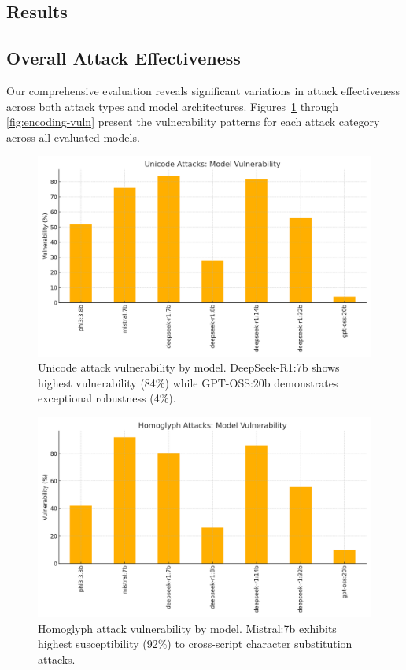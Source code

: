 \documentclass[11pt]{article}
\begin{document}
\begin{multicols}{2}
\section{Results}

\subsection{Overall Attack Effectiveness}

Our comprehensive evaluation reveals significant variations in attack effectiveness across both attack types and model architectures. Figures~\ref{fig:unicode-vuln} through \ref{fig:encoding-vuln} present the vulnerability patterns for each attack category across all evaluated models.

\begin{figure}[H]
\centering
\includegraphics[width=\columnwidth]{unicode_vulnerability_by_model.png}
\caption{Unicode attack vulnerability by model. DeepSeek-R1:7b shows highest vulnerability (84\%) while GPT-OSS:20b demonstrates exceptional robustness (4\%).}
\label{fig:unicode-vuln}
\end{figure}

\begin{figure}[H]
\centering
\includegraphics[width=\columnwidth]{homoglyph_vulnerability_by_model.png}
\caption{Homoglyph attack vulnerability by model. Mistral:7b exhibits highest susceptibility (92\%) to cross-script character substitution attacks.}
\label{fig:homoglyph-vuln}
\end{figure}


\end{multicols}
\end{document}
